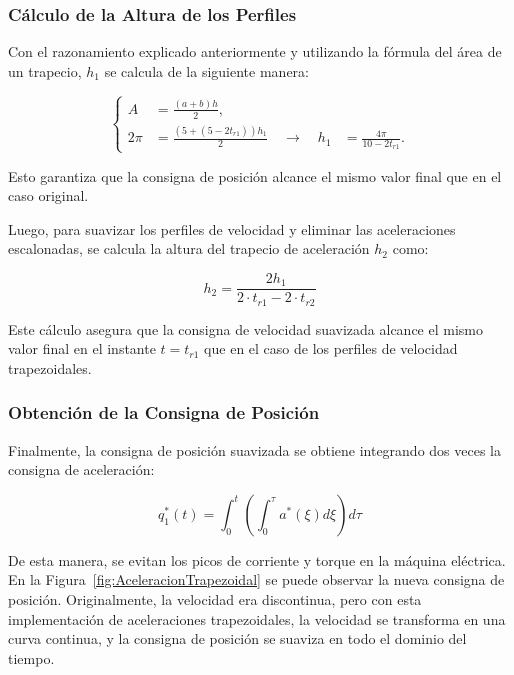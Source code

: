 \documentclass{article}
\begin{document}
\subsubsection{Cálculo de la Altura de los Perfiles}

Con el razonamiento explicado anteriormente y utilizando la fórmula del área de un trapecio, \(h_1\) se calcula de la siguiente manera:

\begin{equation}
\left\{
\begin{aligned}
A &= \frac{(a + b) h}{2}, \\
2 \pi &= \frac{\left( 5 + (5 - 2 t_{r1}) \right) h_1}{2} \quad \rightarrow \quad h_1 &= \frac{4 \pi}{10 - 2 t_{r1}}.
\end{aligned}
\right.
\end{equation}

Esto garantiza que la consigna de posición alcance el mismo valor final que en el caso original.

Luego, para suavizar los perfiles de velocidad y eliminar las aceleraciones escalonadas, se calcula la altura del trapecio de aceleración \( h_2 \) como:

\begin{equation}
    h_2 = \frac{2h_1}{2\cdot t_{r1} - 2\cdot t_{r2}}
\end{equation}

Este cálculo asegura que la consigna de velocidad suavizada alcance el mismo valor final en el instante \(t = t_{r1}\) que en el caso de los perfiles de velocidad trapezoidales.

\subsubsection{Obtención de la Consigna de Posición}

Finalmente, la consigna de posición suavizada se obtiene integrando dos veces la consigna de aceleración:

\begin{equation}
    q_1^*(t) = \int_0^t \left( \int_0^\tau a^*(\xi) d\xi \right) d\tau
\end{equation}

De esta manera, se evitan los picos de corriente y torque en la máquina eléctrica. En la Figura~\ref{fig:AceleracionTrapezoidal} se puede observar la nueva consigna de posición. Originalmente, la velocidad era discontinua, pero con esta implementación de aceleraciones trapezoidales, la velocidad se transforma en una curva continua, y la consigna de posición se suaviza en todo el dominio del tiempo.
\end{document}
